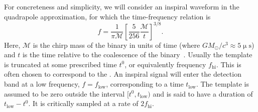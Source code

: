 For concreteness and simplicity, we will consider an inspiral waveform in the
quadrapole approximation, for which the time-frequency relation is
%
\begin{equation} \label{eq:fgw}
%
f = \frac{1}{\mathcal{\pi M}} \left[ \frac{5}{256}\frac{\mathcal{M}}{t}
\right]^{3/8}.
%
\end{equation}
%
Here, $\mathcal{M}$ is the chirp mass of the binary in units of time (where $G
M_\odot / c^3 \approx 5 \upmu\mathrm{s}$) and $t$ is the time relative to the
coalescence of the binary~\citep{findchirppaper, kidder1992}.  Usually the
template is truncated at some prescribed time $t^0$, or equivalently frequency
$f_\mathrm{hi}$.  This is often chosen to correspond to the \ISCO. An inspiral
signal will enter the detection band at a low frequency, $f = f_\mathrm{low}$,
corresponding to a time $t_\mathrm{low}$.  The template is assumed to be zero
outside the interval $[t^0, t_\mathrm{low})$ and is said to have  a duration of
$t_\mathrm{low} - t^0$. It is critically sampled at a rate of $2
f_\mathrm{hi}$.

